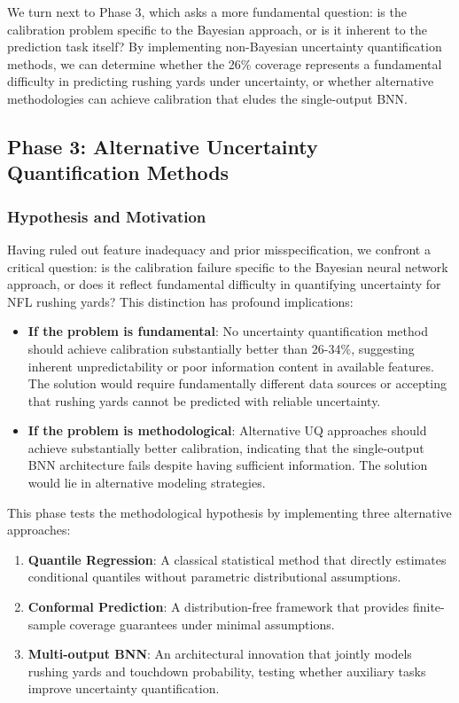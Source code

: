 We turn next to Phase 3, which asks a more fundamental question: is the calibration problem specific to the Bayesian approach, or is it inherent to the prediction task itself? By implementing non-Bayesian uncertainty quantification methods, we can determine whether the 26\% coverage represents a fundamental difficulty in predicting rushing yards under uncertainty, or whether alternative methodologies can achieve calibration that eludes the single-output BNN.

\subsection{Phase 3: Alternative Uncertainty Quantification Methods}
\label{subsec:phase3_alternatives}

\subsubsection{Hypothesis and Motivation}

Having ruled out feature inadequacy and prior misspecification, we confront a critical question: is the calibration failure specific to the Bayesian neural network approach, or does it reflect fundamental difficulty in quantifying uncertainty for NFL rushing yards? This distinction has profound implications:

\begin{itemize}
    \item \textbf{If the problem is fundamental}: No uncertainty quantification method should achieve calibration substantially better than 26-34\%, suggesting inherent unpredictability or poor information content in available features. The solution would require fundamentally different data sources or accepting that rushing yards cannot be predicted with reliable uncertainty.

    \item \textbf{If the problem is methodological}: Alternative UQ approaches should achieve substantially better calibration, indicating that the single-output BNN architecture fails despite having sufficient information. The solution would lie in alternative modeling strategies.
\end{itemize}

This phase tests the methodological hypothesis by implementing three alternative approaches:

\begin{enumerate}
    \item \textbf{Quantile Regression}: A classical statistical method that directly estimates conditional quantiles without parametric distributional assumptions.
    \item \textbf{Conformal Prediction}: A distribution-free framework that provides finite-sample coverage guarantees under minimal assumptions.
    \item \textbf{Multi-output BNN}: An architectural innovation that jointly models rushing yards and touchdown probability, testing whether auxiliary tasks improve uncertainty quantification.
\end{enumerate}

